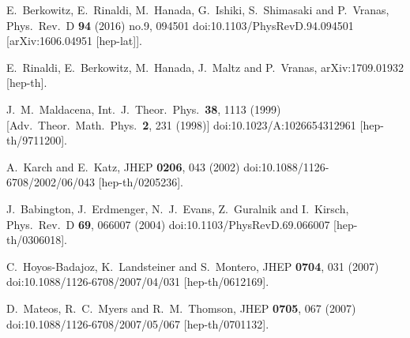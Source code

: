 \documentclass[a4paper]{jpconf}
\begin{document}
\begin{thebibliography}{9}
  E.~Berkowitz, E.~Rinaldi, M.~Hanada, G.~Ishiki, S.~Shimasaki and P.~Vranas,
  Phys.\ Rev.\ D {\bf 94} (2016) no.9,  094501
  doi:10.1103/PhysRevD.94.094501
  [arXiv:1606.04951 [hep-lat]].


  E.~Rinaldi, E.~Berkowitz, M.~Hanada, J.~Maltz and P.~Vranas,
  arXiv:1709.01932 [hep-th].


  J.~M.~Maldacena,
  Int.\ J.\ Theor.\ Phys.\  {\bf 38}, 1113 (1999)
  [Adv.\ Theor.\ Math.\ Phys.\  {\bf 2}, 231 (1998)]
  doi:10.1023/A:1026654312961
  [hep-th/9711200].
  
  A.~Karch and E.~Katz,
  JHEP {\bf 0206}, 043 (2002)
  doi:10.1088/1126-6708/2002/06/043
  [hep-th/0205236].
  
  J.~Babington, J.~Erdmenger, N.~J.~Evans, Z.~Guralnik and I.~Kirsch,
  Phys.\ Rev.\ D {\bf 69}, 066007 (2004)
  doi:10.1103/PhysRevD.69.066007
  [hep-th/0306018].

  C.~Hoyos-Badajoz, K.~Landsteiner and S.~Montero,
  JHEP {\bf 0704}, 031 (2007)
  doi:10.1088/1126-6708/2007/04/031
  [hep-th/0612169].

  D.~Mateos, R.~C.~Myers and R.~M.~Thomson,
  JHEP {\bf 0705}, 067 (2007)
  doi:10.1088/1126-6708/2007/05/067
  [hep-th/0701132].


\end{thebibliography}
\end{document}
